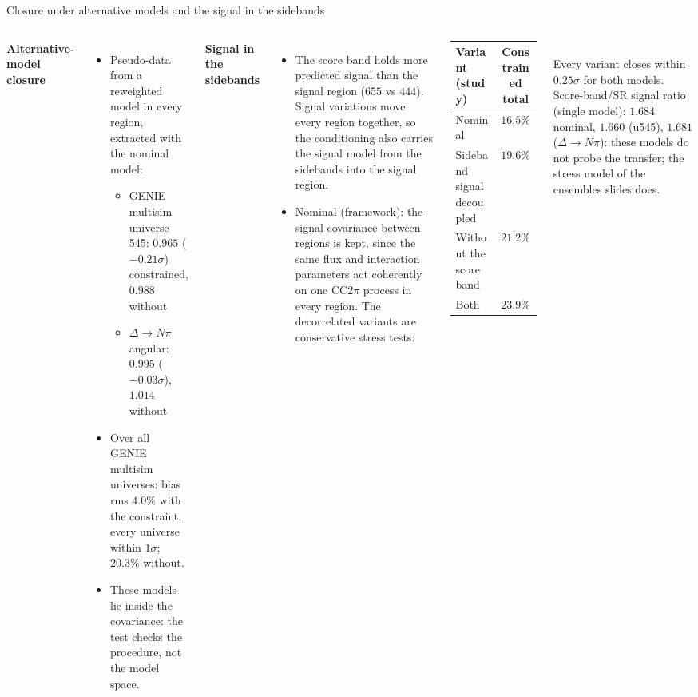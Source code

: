 \documentclass[aspectratio=169,10pt]{beamer}
\begin{document}
\begin{frame}{Closure under alternative models and the signal in the sidebands}
  \begin{columns}[T]
  \textbf{\color{ubred}Alternative-model closure}
  \begin{itemize}\footnotesize\setlength\itemsep{2pt}
    \item Pseudo-data from a reweighted model in every region, extracted with the nominal model:
    \begin{itemize}\footnotesize
      \item GENIE multisim universe 545: $0.965$ ($-0.21\sigma$) constrained, $0.988$ without
      \item $\Delta\to N\pi$ angular: $0.995$ ($-0.03\sigma$), $1.014$ without
    \end{itemize}
    \item Over all GENIE multisim universes: bias rms $4.0\%$ with the constraint, every universe within
          $1\sigma$; $20.3\%$ without.
    \item These models lie inside the covariance: the test checks the procedure, not the model space.
  \end{itemize}
  \textbf{\color{ubred}Signal in the sidebands}
  \begin{itemize}\footnotesize\setlength\itemsep{2pt}
    \item The score band holds more predicted signal than the signal region ($655$ vs $444$). Signal
          variations move every region together, so the conditioning also carries the signal model from the
          sidebands into the signal region.
    \item Nominal (framework): the signal covariance between regions is kept, since the same flux and interaction
          parameters act coherently on one CC$2\pi$ process in every region. The decorrelated variants are
          conservative stress tests:
  \end{itemize}
  \scriptsize\setlength{\tabcolsep}{3pt}
  \begin{tabular}{lc}
    \toprule
    Variant (study) & Constrained total \\
    \midrule
    Nominal & $16.5\%$ \\
    Sideband signal decoupled & $19.6\%$ \\
    Without the score band & $21.2\%$ \\
    Both & $23.9\%$ \\
    \bottomrule
  \end{tabular}\\[1mm]
  {\scriptsize Every variant closes within $0.25\sigma$ for both models. Score-band/SR signal ratio (single model): $1.684$
  nominal, $1.660$ (u545), $1.681$ ($\Delta\to N\pi$): these models do not probe the transfer; the stress model
  of the ensembles slides does.}
  \end{columns}
\end{frame}
\end{document}
